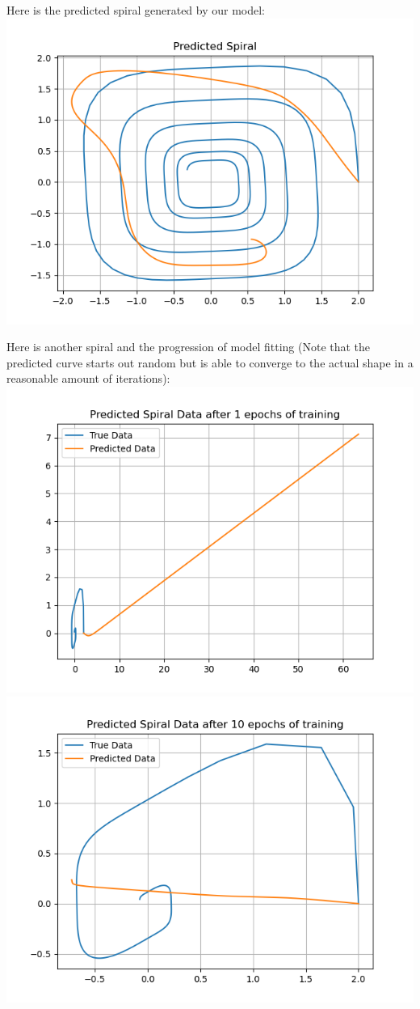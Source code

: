 \documentclass{article}
\begin{document}
Here is the predicted spiral generated by our model:
\includegraphics[width = \linewidth]{icml files/pred_spiral.png}

Here is another spiral and the progression of model fitting (Note that the predicted curve starts out random but is able to converge to the actual shape in a reasonable amount of iterations): 
\\
\includegraphics[width = 0.48\linewidth, valign=m]{icml files/pred_spiral_1.png} \includegraphics[width = 0.48\linewidth, valign=m]{icml files/pred_spiral_10.png}
\end{document}
